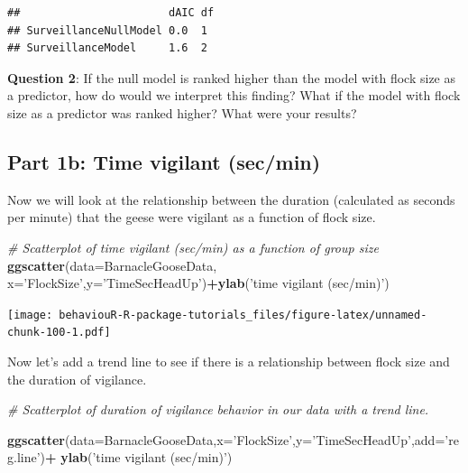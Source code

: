 \documentclass[]{book}
\newenvironment{Shaded}{\begin{snugshade}}{\end{snugshade}}
\newcommand{\CommentTok}[1]{\textcolor[rgb]{0.56,0.35,0.01}{\textit{#1}}}
\newcommand{\DataTypeTok}[1]{\textcolor[rgb]{0.13,0.29,0.53}{#1}}
\newcommand{\KeywordTok}[1]{\textcolor[rgb]{0.13,0.29,0.53}{\textbf{#1}}}
\newcommand{\NormalTok}[1]{#1}
\newcommand{\OperatorTok}[1]{\textcolor[rgb]{0.81,0.36,0.00}{\textbf{#1}}}
\newcommand{\StringTok}[1]{\textcolor[rgb]{0.31,0.60,0.02}{#1}}
\begin{document}
\begin{verbatim}
##                       dAIC df
## SurveillanceNullModel 0.0  1 
## SurveillanceModel     1.6  2
\end{verbatim}

\textbf{Question 2}: If the null model is ranked higher than the model with flock size as a predictor, how do would we interpret this finding? What if the model with flock size as a predictor was ranked higher? What were your results?

\hypertarget{part-1b-time-vigilant-secmin}{%
\subsection{Part 1b: Time vigilant (sec/min)}\label{part-1b-time-vigilant-secmin}}

Now we will look at the relationship between the duration (calculated as seconds per minute) that the geese were vigilant as a function of flock size.

\begin{Shaded}
\begin{Highlighting}[]
\CommentTok{# Scatterplot of time vigilant (sec/min) as a function of group size}
\KeywordTok{ggscatter}\NormalTok{(}\DataTypeTok{data=}\NormalTok{BarnacleGooseData,}
          \DataTypeTok{x=}\StringTok{'FlockSize'}\NormalTok{,}\DataTypeTok{y=}\StringTok{'TimeSecHeadUp'}\NormalTok{)}\OperatorTok{+}\KeywordTok{ylab}\NormalTok{(}\StringTok{'time vigilant (sec/min)'}\NormalTok{)}
\end{Highlighting}
\end{Shaded}

\texttt{[image: behaviouR-R-package-tutorials\_files/figure-latex/unnamed-chunk-100-1.pdf]}

Now let's add a trend line to see if there is a relationship between flock size and the duration of vigilance.

\begin{Shaded}
\begin{Highlighting}[]
\CommentTok{# Scatterplot of duration of vigilance behavior in our data with a trend line.}

\KeywordTok{ggscatter}\NormalTok{(}\DataTypeTok{data=}\NormalTok{BarnacleGooseData,}\DataTypeTok{x=}\StringTok{'FlockSize'}\NormalTok{,}\DataTypeTok{y=}\StringTok{'TimeSecHeadUp'}\NormalTok{,}\DataTypeTok{add=}\StringTok{'reg.line'}\NormalTok{)}\OperatorTok{+}
\StringTok{  }\KeywordTok{ylab}\NormalTok{(}\StringTok{'time vigilant (sec/min)'}\NormalTok{)}
\end{Highlighting}
\end{Shaded}
\end{document}
